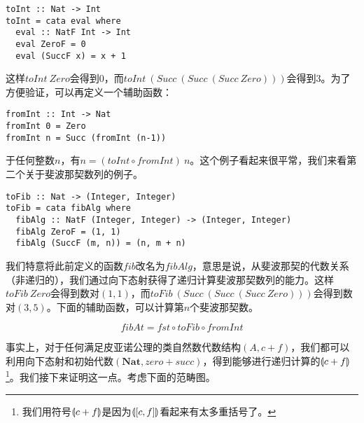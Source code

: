 \documentclass{article}
\begin{document}
\lstset{frame=single}
\begin{lstlisting}[style=Haskell]
toInt :: Nat -> Int
toInt = cata eval where
  eval :: NatF Int -> Int
  eval ZeroF = 0
  eval (SuccF x) = x + 1
\end{lstlisting}

这样$toInt\ Zero$会得到0，而$toInt\ (Succ\ (Succ\ (Succ\ Zero)))$会得到3。为了方便验证，可以再定义一个辅助函数：

\begin{lstlisting}[style=Haskell]
fromInt :: Int -> Nat
fromInt 0 = Zero
fromInt n = Succ (fromInt (n-1))
\end{lstlisting}

于任何整数$n$，有$n = (toInt \circ fromInt)\ n$。这个例子看起来很平常，我们来看第二个关于斐波那契数列的例子。

\begin{lstlisting}[style=Haskell]
toFib :: Nat -> (Integer, Integer)
toFib = cata fibAlg where
  fibAlg :: NatF (Integer, Integer) -> (Integer, Integer)
  fibAlg ZeroF = (1, 1)
  fibAlg (SuccF (m, n)) = (n, m + n)
\end{lstlisting}

我们特意将此前定义的函数$fib$改名为$fibAlg$，意思是说，从斐波那契的代数关系（非递归的），我们通过向下态射获得了递归计算斐波那契数列的能力。这样$toFib\ Zero$会得到数对$(1, 1)$，而$toFib\ (Succ\ (Succ\ (Succ\ Zero)))$会得到数对$(3, 5)$。下面的辅助函数，可以计算第$n$个斐波那契数。

\[
fibAt = fst \circ toFib \circ fromInt
\]

事实上，对于任何满足皮亚诺公理的类自然数代数结构$(A, c + f)$，我们都可以利用向下态射和初始代数$(\mathbf{Nat}, zero + succ)$，得到能够进行递归计算的$\llparenthesis c + f \rrparenthesis$\footnote{我们用符号$\llparenthesis c + f \rrparenthesis$是因为$\llparenthesis [c, f] \rrparenthesis$看起来有太多重括号了。}。我们接下来证明这一点。考虑下面的范畴图。

\begin{center}
\end{center}
\end{document}

